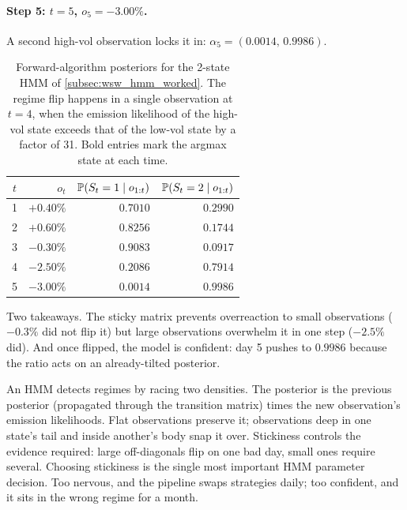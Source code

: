 \paragraph{Step 5: $t = 5$, $o_5 = -3.00\%$.} A second high-vol
observation locks it in: $\alpha_5 = (0.0014,\, 0.9986)$.

\begin{table}[htbp]
\centering
\begin{tabular}{crrr}
\toprule
$t$ & $o_t$ & $\mathbb{P}(S_t = 1 \mid o_{1:t})$
  & $\mathbb{P}(S_t = 2 \mid o_{1:t})$ \\
\midrule
1 & $+0.40\%$ & $\mathbf{0.7010}$ & $0.2990$ \\
2 & $+0.60\%$ & $\mathbf{0.8256}$ & $0.1744$ \\
3 & $-0.30\%$ & $\mathbf{0.9083}$ & $0.0917$ \\
4 & $-2.50\%$ & $0.2086$ & $\mathbf{0.7914}$ \\
5 & $-3.00\%$ & $0.0014$ & $\mathbf{0.9986}$ \\
\bottomrule
\end{tabular}
\caption{Forward-algorithm posteriors for the 2-state HMM of
\cref{subsec:wsw_hmm_worked}. The regime flip happens in a single
observation at $t = 4$, when the emission likelihood of the
high-vol state exceeds that of the low-vol state by a factor of
31. Bold entries mark the argmax state at each time.}
\label{tab:wsw_hmm_alphas}
\end{table}

Two takeaways. The sticky matrix prevents overreaction to small
observations ($-0.3\%$ did not flip it) but large observations
overwhelm it in one step ($-2.5\%$ did). And once flipped, the
model is confident: day 5 pushes to $0.9986$ because the ratio acts
on an already-tilted posterior.

\begin{intuitionbox}
An HMM detects regimes by racing two densities. The posterior is
the previous posterior (propagated through the transition matrix)
times the new observation's emission likelihoods. Flat observations
preserve it; observations deep in one state's tail and inside
another's body snap it over. Stickiness controls the evidence
required: large off-diagonals flip on one bad day, small ones
require several. Choosing stickiness is the single most important
HMM parameter decision. Too nervous, and the pipeline swaps
strategies daily; too confident, and it sits in the wrong regime for
a month.
\end{intuitionbox}

